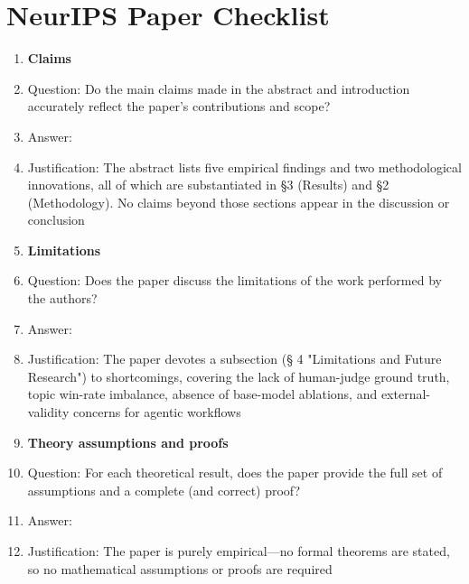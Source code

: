 \documentclass{article}
\begin{document}

\newpage %

\section*{NeurIPS Paper Checklist}

\begin{enumerate}

\item {\bf Claims}
    \item[] Question: Do the main claims made in the abstract and introduction accurately reflect the paper's contributions and scope?
    \item[] Answer: \answerYes{} %
    \item[] Justification: The abstract lists five empirical findings and two methodological innovations, all of which are substantiated in §3 (Results) and §2 (Methodology). No claims beyond those sections appear in the discussion or conclusion %

\item {\bf Limitations}
    \item[] Question: Does the paper discuss the limitations of the work performed by the authors?
    \item[] Answer: \answerYes{} %
    \item[] Justification: The paper devotes a subsection (§ 4 "Limitations and Future Research") to shortcomings, covering the lack of human-judge ground truth, topic win-rate imbalance, absence of base-model ablations, and external-validity concerns for agentic workflows

\item {\bf Theory assumptions and proofs}
    \item[] Question: For each theoretical result, does the paper provide the full set of assumptions and a complete (and correct) proof?
    \item[] Answer: \answerNA{} %
    \item[] Justification: The paper is purely empirical—no formal theorems are stated, so no mathematical assumptions or proofs are required


\end{enumerate}
\end{document}
